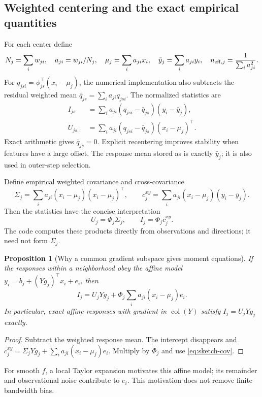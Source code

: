 \documentclass[11pt,a4paper]{article}
\newcommand{\col}{\operatorname{col}}
\newcommand{\code}[1]{\texttt{\detokenize{#1}}}
\newtheorem{proposition}{Proposition}
\begin{document}
\subsection{Weighted centering and the exact empirical quantities}
For each center define
\begin{equation}\label{eq:means}
 N_j=\sum_iw_{ji},\quad a_{ji}=w_{ji}/N_j,\quad
 \mu_j=\sum_i a_{ji}x_i,\quad \bar y_j=\sum_i a_{ji}y_i,\quad
 n_{{\rm eff},j}=\frac{1}{\sum_i a_{ji}^2}.
\end{equation}
For $q_{jsi}=\phi_{js}^\top(x_i-\mu_j)$, the numerical implementation
also subtracts the residual weighted mean
$\bar q_{js}=\sum_i a_{ji}q_{jsi}$. The normalized statistics are
\begin{align}
 I_{js}&=\sum_i a_{ji}(q_{jsi}-\bar q_{js})(y_i-\bar y_j),
 \label{eq:I}\\
 U_{js,:}&=\sum_i a_{ji}(q_{jsi}-\bar q_{js})(x_i-\mu_j)^\top.
 \label{eq:U}
\end{align}
Exact arithmetic gives $\bar q_{js}=0$. Explicit recentering improves
stability when features have a large offset. The response mean stored as
\code{statistics.S} is exactly $\bar y_j$; it is also used in outer-step
selection.

Define empirical weighted covariance and cross-covariance
\begin{equation}\label{eq:cov}
 \Sigma_j=\sum_i a_{ji}(x_i-\mu_j)(x_i-\mu_j)^\top,\qquad
 c_j^{xy}=\sum_i a_{ji}(x_i-\mu_j)(y_i-\bar y_j).
\end{equation}
Then the statistics have the concise interpretation
\begin{equation}\label{eq:sketch-cov}
 U_j=\Phi_j\Sigma_j,\qquad I_j=\Phi_j c_j^{xy}.
\end{equation}
The code computes these products directly from observations and directions;
it need not form $\Sigma_j$.

\begin{proposition}[Why a common gradient subspace gives moment equations]
If the responses within a neighborhood obey the affine model
$y_i=b_j+(Yg_j)^\top x_i+e_i$, then
\begin{equation}\label{eq:moment-model}
 I_j=U_jYg_j+\Phi_j\sum_i a_{ji}(x_i-\mu_j)e_i.
\end{equation}
In particular, exact affine responses with gradient in $\col(Y)$ satisfy
$I_j=U_jYg_j$ exactly.
\end{proposition}
\begin{proof}
Subtract the weighted response mean. The intercept disappears and
$c_j^{xy}=\Sigma_jYg_j+\sum_i a_{ji}(x_i-\mu_j)e_i$.
Multiply by $\Phi_j$ and use \eqref{eq:sketch-cov}.
\end{proof}
For smooth $f$, a local Taylor expansion motivates this affine model;
its remainder and observational noise contribute to $e_i$. This motivation
does not remove finite-bandwidth bias.
\end{document}
